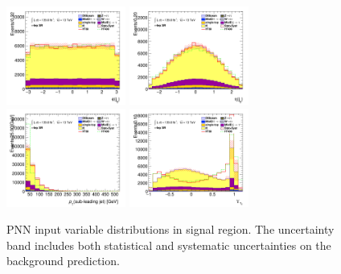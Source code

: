 		\begin{figure}[!htp]
			\begin{center}    
			\includegraphics[width=0.35\textwidth]{chapters/chapter6_HPlus/images/taulep/jet_0_phi_SR_TAULEP.png}
			\includegraphics[width=0.35\textwidth]{chapters/chapter6_HPlus/images/taulep/jet_0_eta_SR_TAULEP.png} \\
			\includegraphics[width=0.35\textwidth]{chapters/chapter6_HPlus/images/taulep/jet_1_pt_SR_TAULEP.png}
			\includegraphics[width=0.35\textwidth]{chapters/chapter6_HPlus/images/taulep/tau_0_upsilon_SR_TAULEP.png} \\
			\end{center}
			\caption{
			PNN input variable distributions in \taulep signal region. The uncertainty band includes both statistical and systematic uncertainties on the background prediction. 
			}
			\label{fig:sr-taulep-4}
		\end{figure}